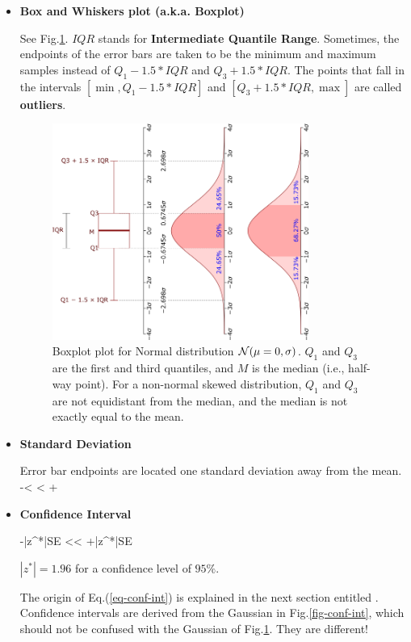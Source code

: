 \begin{itemize}
\item{\bf Box and Whiskers plot (a.k.a. Boxplot)}

See Fig.\ref{fig-boxplot}.
$IQR$ stands for {\bf
Intermediate Quantile Range}.
Sometimes, the endpoints of the
error bars are taken to be the minimum and maximum samples
instead of $Q_1- 1.5 *IQR$ and $Q_3+ 1.5 *IQR$.
The points that fall
in the intervals $[\min,Q_1- 1.5* IQR]$
and $[Q_3+ 1.5 *IQR, \max]$
are
called {\bf outliers}.
\begin{figure}[h!]
\centering
\includegraphics[width=3.3in]
{conventions/Boxplot.png}
\caption{Boxplot plot for Normal
distribution ${\cal N}(\mu=0,\sigma)$.
$Q_1$ and $Q_3$ are the first and third
quantiles, and $M$ is the median (i.e., half-way point).
For a non-normal skewed
distribution, $Q_1$ and $Q_3$
are not equidistant from the median, and the
median is not exactly equal to the mean. }
 \label{fig-boxplot}
\end{figure}



\item{\bf Standard Deviation}

Error bar endpoints are located one standard deviation
away from the mean.
\beq
\mu-\s< \mu < \mu+\s
\eeq

\item{\bf Confidence Interval}

\beq
\mu-|z^*|SE <\mu < \mu+|z^*|SE
\label{eq-conf-int}
\eeq

$|z^*|=1.96$ for a confidence level of $95\%$.

The origin of Eq.(\ref{eq-conf-int})
is explained in the next section entitled .
Confidence intervals are
derived from the Gaussian in Fig.\ref{fig-conf-int},
which should not be confused with the
Gaussian of Fig.\ref{fig-boxplot}.
They are different!

\end{itemize}
